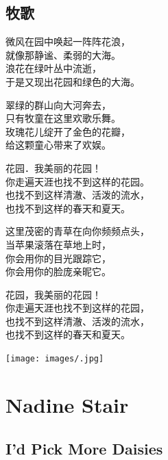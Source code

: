 \documentclass[
]{book}
\renewenvironment{quote}{\begin{VF}}{\end{VF}}
\begin{document}
\hypertarget{section-63}{%
\section{牧歌}\label{section-63}}

\begin{quote}
微风在园中唤起一阵阵花浪，\\
就像那静谧、柔弱的大海。\\
浪花在绿叶丛中流逝，\\
于是又现出花园和绿色的大海。

翠绿的群山向大河奔去，\\
只有牧童在这里欢歌乐舞。\\
玫瑰花儿绽开了金色的花瓣，\\
给这颗童心带来了欢娱。

花园．我美丽的花园！\\
你走遍天涯也找不到这样的花园。\\
也找不到这样清澈、活泼的流水，\\
也找不到这样的春天和夏天。

这里茂密的青草在向你频频点头，\\
当苹果滚落在草地上时，\\
你会用你的目光跟踪它，\\
你会用你的脸庞亲昵它。

花园，我美丽的花园！\\
你走遍天涯也找不到这样的花园，\\
也找不到这样清澈、活泼的流水，\\
也找不到这样的春天和夏天。
\end{quote}

\texttt{[image: images/.jpg]}

\hypertarget{nadine-stair}{%
\chapter{Nadine Stair}\label{nadine-stair}}

\hypertarget{id-pick-more-daisies}{%
\section{I'd Pick More Daisies}\label{id-pick-more-daisies}}
\end{document}
